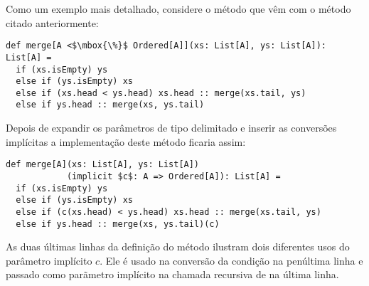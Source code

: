 Como um exemplo mais detalhado, considere o método \lstinline@merge@ que vêm com
o método \lstinline@sort@ citado anteriormente:
\begin{lstlisting}
def merge[A <$\mbox{\%}$ Ordered[A]](xs: List[A], ys: List[A]): List[A] =
  if (xs.isEmpty) ys
  else if (ys.isEmpty) xs
  else if (xs.head < ys.head) xs.head :: merge(xs.tail, ys)
  else if ys.head :: merge(xs, ys.tail)
\end{lstlisting}
Depois de expandir os parâmetros de tipo delimitado e inserir as conversões implícitas
a implementação deste método ficaria assim:
\begin{lstlisting}
def merge[A](xs: List[A], ys: List[A])
            (implicit $c$: A => Ordered[A]): List[A] =
  if (xs.isEmpty) ys
  else if (ys.isEmpty) xs
  else if (c(xs.head) < ys.head) xs.head :: merge(xs.tail, ys)
  else if ys.head :: merge(xs, ys.tail)(c)
\end{lstlisting}

As duas últimas linhas da definição do método ilustram dois diferentes usos
do parâmetro implícito $c$. Ele é usado na conversão da condição na penúltima linha e passado
como parãmetro implícito na chamada recursiva de \lstinline@merge@ na última linha.

